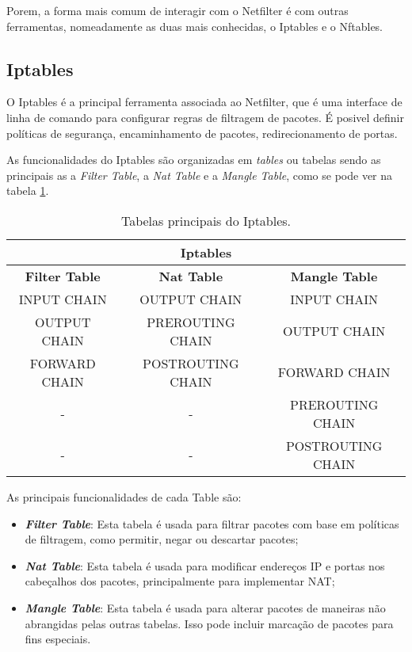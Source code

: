 Porem, a forma mais comum de interagir com o Netfilter é com outras ferramentas,
nomeadamente as duas mais conhecidas, o Iptables e o Nftables.

\subsection{Iptables}

O Iptables é a principal ferramenta associada ao Netfilter, que é uma interface
de linha de comando para configurar regras de filtragem de pacotes.
É posivel definir políticas de segurança, encaminhamento de pacotes,
redirecionamento de portas. 

As funcionalidades do Iptables são organizadas em \textit{tables} ou tabelas
sendo as principais as a \textit{Filter Table}, a \textit{Nat Table} e a
\textit{Mangle Table}, como se pode ver na tabela \ref{ipt1}.

\begin{table}[h]
\centering
\begin{tabular}{|c|c|c|}
\hline
\multicolumn{3}{|c|}{Iptables}\\
\hline
\rowcolor{yellow!50}\textbf{Filter Table} & \textbf{Nat Table} & \textbf{Mangle Table}\\
\hline
INPUT CHAIN & OUTPUT CHAIN & INPUT CHAIN\\
\hline
OUTPUT CHAIN & PREROUTING CHAIN & OUTPUT CHAIN\\
\hline
FORWARD CHAIN & POSTROUTING CHAIN & FORWARD CHAIN\\
\hline
- & - & PREROUTING CHAIN\\
\hline
- & - & POSTROUTING CHAIN\\
\hline
\end{tabular}
\caption{Tabelas principais do Iptables.}
\label{ipt1}
\end{table}


As principais funcionalidades de cada Table são:

\begin{itemize}
\item \textbf{\textit{Filter Table}}: Esta tabela é usada para filtrar pacotes com base em 
políticas de filtragem, como permitir, negar ou descartar pacotes;
\item \textbf{\textit{Nat Table}}: Esta tabela é usada para modificar endereços IP e portas
nos cabeçalhos dos pacotes, principalmente para implementar NAT;
\item \textbf{\textit{Mangle Table}}: Esta tabela é usada para alterar pacotes de maneiras
não abrangidas pelas outras tabelas. Isso pode incluir marcação de pacotes para fins especiais.
\end{itemize}



